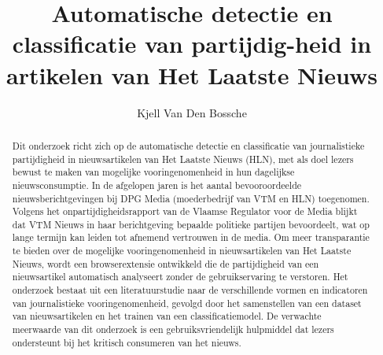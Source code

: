 \documentclass{hogent-article}
\title{Automatische detectie en classificatie van partijdig-heid in artikelen van Het Laatste Nieuws}
\author{Kjell Van Den Bossche}
\begin{document}
\begin{abstract}
    Dit onderzoek richt zich op de automatische detectie en classificatie van journalistieke partijdigheid in nieuwsartikelen van Het Laatste Nieuws (HLN), met als doel lezers bewust te maken van mogelijke vooringenomenheid in hun dagelijkse nieuwsconsumptie. In de afgelopen jaren is het aantal bevooroordeelde nieuwsberichtgevingen bij DPG Media (moederbedrijf van VTM en HLN) toegenomen. Volgens het onpartijdigheidsrapport van de Vlaamse Regulator voor de Media blijkt dat VTM Nieuws in haar berichtgeving bepaalde politieke partijen bevoordeelt, wat op lange termijn kan leiden tot afnemend vertrouwen in de media. Om meer transparantie te bieden over de mogelijke vooringenomenheid in nieuwsartikelen van Het Laatste Nieuws, wordt een browserextensie ontwikkeld die de partijdigheid van een nieuwsartikel automatisch analyseert zonder de gebruikservaring te verstoren. Het onderzoek bestaat uit een literatuurstudie naar de verschillende vormen en indicatoren van journalistieke vooringenomenheid, gevolgd door het samenstellen van een dataset van nieuwsartikelen en het trainen van een classificatiemodel. De verwachte meerwaarde van dit onderzoek is een gebruiksvriendelijk hulpmiddel dat lezers ondersteunt bij het kritisch consumeren van het nieuws.
\end{abstract}

\begin{sloppypar}
    \tableofcontents
\end{sloppypar}



\begin{sloppypar}
    \printbibliography[heading=bibintoc]
\end{sloppypar}
\end{document}
